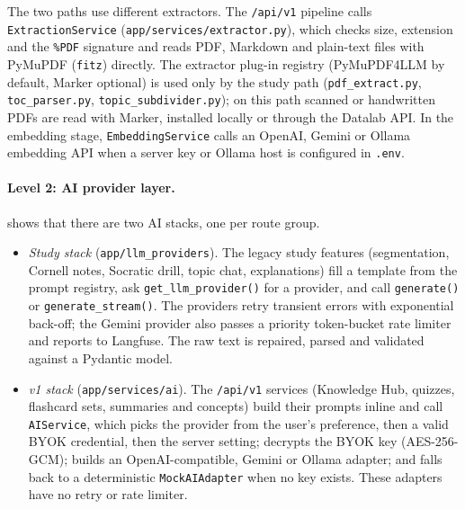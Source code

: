 The two paths use different extractors. The \texttt{/api/v1} pipeline calls
\texttt{ExtractionService} (\texttt{app/services/extractor.py}), which checks size,
extension and the \texttt{\%PDF} signature and reads PDF, Markdown and plain-text files
with PyMuPDF (\texttt{fitz}) directly. The extractor plug-in registry (PyMuPDF4LLM by
default, Marker optional) is used only by the study path (\texttt{pdf\_extract.py},
\texttt{toc\_parser.py}, \texttt{topic\_subdivider.py}); on this path scanned or
handwritten PDFs are read with Marker, installed locally or through the Datalab API. In
the embedding stage, \texttt{EmbeddingService} calls an OpenAI, Gemini or Ollama
embedding API when a server key or Ollama host is configured in \texttt{.env}.


\paragraph{Level 2: AI provider layer.}
 shows that there are two AI stacks, one per route group.
\begin{itemize}[leftmargin=*]
  \item \emph{Study stack} (\texttt{app/llm\_providers}). The legacy study features
    (segmentation, Cornell notes, Socratic drill, topic chat, explanations) fill a
    template from the prompt registry, ask \texttt{get\_llm\_provider()} for a provider,
    and call \texttt{generate()} or \texttt{generate\_stream()}. The providers retry
    transient errors with exponential back-off; the Gemini provider also passes a
    priority token-bucket rate limiter and reports to Langfuse. The raw text is
    repaired, parsed and validated against a Pydantic model.
  \item \emph{v1 stack} (\texttt{app/services/ai}). The \texttt{/api/v1} services
    (Knowledge Hub, quizzes, flashcard sets, summaries and concepts) build their prompts
    inline and call \texttt{AIService}, which picks the provider from the user's
    preference, then a valid BYOK credential, then the server setting; decrypts the
    BYOK key (AES-256-GCM); builds an OpenAI-compatible, Gemini or Ollama adapter; and
    falls back to a deterministic \texttt{MockAIAdapter} when no key exists. These
    adapters have no retry or rate limiter.
\end{itemize}


